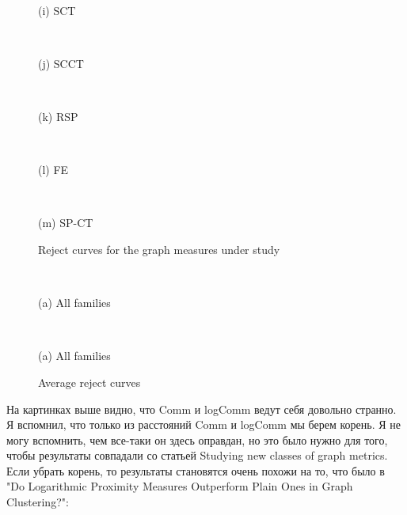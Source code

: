 \documentclass{article}
\begin{document}
\begin{figure}[H]
	\begin{minipage}{.195\textwidth} %
		\\\centerline{(i) SCT}
	\end{minipage}
	\begin{minipage}{.195\textwidth} %
		\\\centerline{(j) SCCT}
	\end{minipage}
	\begin{minipage}{.195\textwidth} %
		\\\centerline{(k) RSP}
	\end{minipage}
	\begin{minipage}{.195\textwidth} %
		\\\centerline{(l) FE}
	\end{minipage}
	\begin{minipage}{.195\textwidth} %
		\\\centerline{(m) SP-CT}
	\end{minipage}

    \caption{\label{f_Reject}Reject curves for the graph measures under study}
\end{figure}

\begin{figure}[H] %
	\begin{minipage}{.56\textwidth}
		\\\centerline{(a) All families}
	\end{minipage}%
	\begin{minipage}{.56\textwidth}
		\\\centerline{(a) All families}
	\end{minipage}%
\caption{\label{f_Rcur}Average reject curves}
\end{figure}

На картинках выше видно, что Comm и logComm ведут себя довольно странно. Я вспомнил, что только из расстояний Comm и logComm мы берем корень. Я не могу вспомнить, чем все-таки он здесь оправдан, но это было нужно для того, чтобы результаты совпадали со статьей Studying new classes of graph metrics. Если убрать корень, то результаты становятся очень похожи на то, что было в "Do Logarithmic Proximity Measures Outperform Plain Ones in Graph Clustering?":
\end{document}
